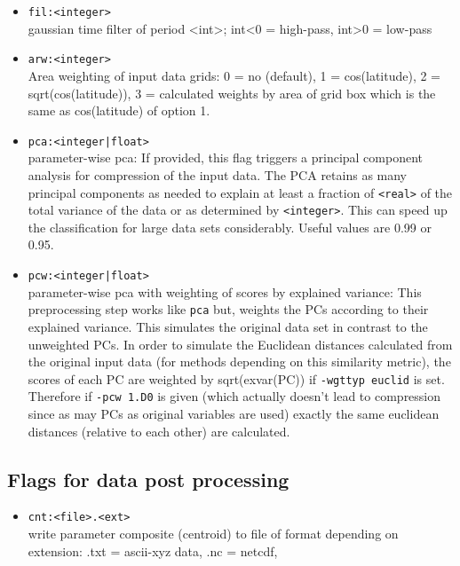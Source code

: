 \documentclass[12pt, oneside, a4paper, headsepline, plainheadsepline]{scrbook}
\begin{document}
\begin{itemize}
\item \verb+fil:<integer>+ \\        
		gaussian time filter of period <int>; int<0 = high-pass, int>0 = low-pass

\item \verb+arw:<integer>+ \\        
		Area weighting of input data grids: 0 = no (default), 1 = cos(latitude), 2 = sqrt(cos(latitude)), 3 = calculated weights by area of grid box which is the same as cos(latitude) of option 1.
        
\item \verb+pca:<integer|float>+ \\   		        
        parameter-wise pca:	If provided, this flag triggers a principal component analysis for compression of the input data. The PCA retains as many principal components as needed to explain at least a fraction of \verb+<real>+ of the total variance of the data or as determined by \verb+<integer>+. This can speed up the classification for large data sets considerably. Useful values are 0.99 or 0.95.
        
\item \verb+pcw:<integer|float>+ \\   		        
        parameter-wise pca with weighting of scores by explained variance: This preprocessing step works like \verb+pca+ but, weights the PCs according to their explained variance. This simulates the original data set in contrast to the unweighted PCs. In order to simulate the Euclidean distances calculated from the original input data (for methods depending on this similarity metric), the scores of each PC are weighted by sqrt(exvar(PC)) if \verb+-wgttyp euclid+ is set. Therefore if \verb+-pcw 1.D0+ is given (which actually doesn't lead to compression since as may PCs as original variables are used) exactly the same euclidean distances (relative to each other) are calculated.

\end{itemize}        
\subsection{Flags for data post processing}
\begin{itemize}  

\item \verb+cnt:<file>.<ext>+ \\
		write parameter composite (centroid) to file of format depending on extension: 
		.txt = ascii-xyz data, .nc = netcdf, 

\end{itemize}
\end{document}
